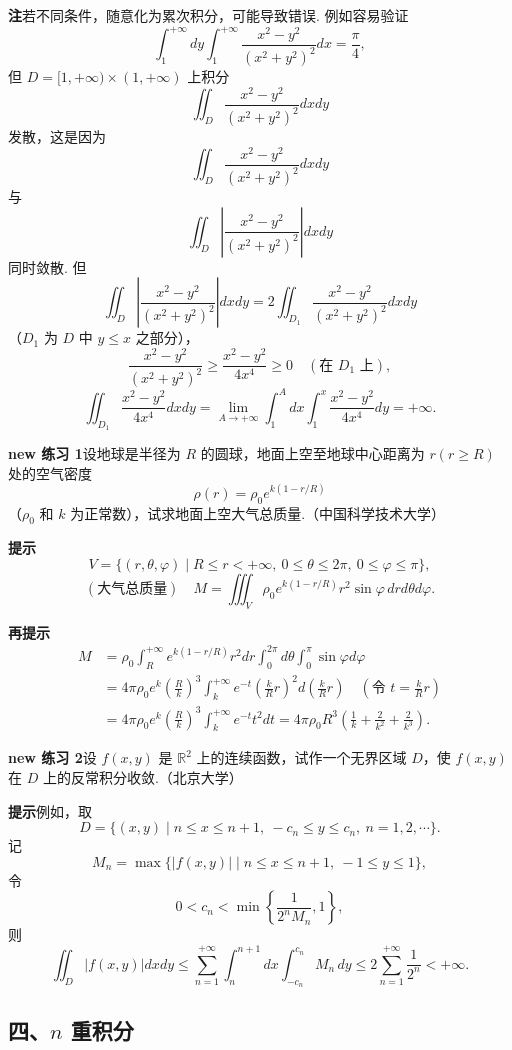\documentclass[UTF8, 12pt, fontset=fandol, oneside]{ctexart}
\begin{document}
\noindent\textbf{注}\quad 若不同条件，随意化为累次积分，可能导致错误. 例如容易验证
\[
\int_1^{+\infty}dy\int_1^{+\infty}\frac{x^2-y^2}{(x^2+y^2)^2}dx=\frac\pi4,
\]
但 $D=[1,+\infty)\times(1,+\infty)$ 上积分
\[
\iint_D\frac{x^2-y^2}{(x^2+y^2)^2}dxdy
\]
发散，这是因为
\[
\iint_D\frac{x^2-y^2}{(x^2+y^2)^2}dxdy
\]
与
\[
\iint_D\left|\frac{x^2-y^2}{(x^2+y^2)^2}\right|dxdy
\]
同时敛散. 但
\[
\iint_D\left|\frac{x^2-y^2}{(x^2+y^2)^2}\right|dxdy
=2\iint_{D_1}\frac{x^2-y^2}{(x^2+y^2)^2}dxdy
\]
（$D_1$ 为 $D$ 中 $y\le x$ 之部分），
\[
\frac{x^2-y^2}{(x^2+y^2)^2}\ge\frac{x^2-y^2}{4x^4}\ge0\quad(\text{在 }D_1\text{ 上}),
\]
\[
\iint_{D_1}\frac{x^2-y^2}{4x^4}dxdy
=\lim_{A\to+\infty}\int_1^A dx\int_1^x
\frac{x^2-y^2}{4x^4}dy=+\infty.
\]

\noindent\textbf{new 练习 1}\quad 设地球是半径为 $R$ 的圆球，地面上空至地球中心距离为 $r(r\ge R)$ 处的空气密度
\[
\rho(r)=\rho_0e^{k(1-r/R)}
\]
（$\rho_0$ 和 $k$ 为正常数），试求地面上空大气总质量.（中国科学技术大学）

\noindent\textbf{提示}\quad
\[
V=\{(r,\theta,\varphi)\mid R\le r<+\infty,\ 0\le\theta\le2\pi,\ 0\le\varphi\le\pi\},
\]
\[
(\text{大气总质量})\quad
M=\iiint_V\rho_0e^{k(1-r/R)}r^2\sin\varphi\,drd\theta d\varphi.
\]

\noindent\textbf{再提示}\quad
\[
\begin{aligned}
M&=\rho_0\int_R^{+\infty}e^{k(1-r/R)}r^2dr\int_0^{2\pi}d\theta\int_0^\pi\sin\varphi d\varphi\\
&=4\pi\rho_0e^k\left(\frac Rk\right)^3
\int_k^{+\infty}e^{-t}\left(\frac{k}{R}r\right)^2d\left(\frac{k}{R}r\right)\quad
\left(\text{令 }t=\frac{k}{R}r\right)\\
&=4\pi\rho_0e^k\left(\frac Rk\right)^3
\int_k^{+\infty}e^{-t}t^2dt
=4\pi\rho_0R^3\left(\frac1k+\frac2{k^2}+\frac2{k^3}\right).
\end{aligned}
\]

\noindent\textbf{new 练习 2}\quad 设 $f(x,y)$ 是 $\mathbb R^2$ 上的连续函数，试作一个无界区域 $D$，使 $f(x,y)$ 在 $D$ 上的反常积分收敛.（北京大学）

\noindent\textbf{提示}\quad 例如，取
\[
D=\{(x,y)\mid n\le x\le n+1,\ -c_n\le y\le c_n,\ n=1,2,\cdots\}.
\]
记
\[
M_n=\max\{|f(x,y)|\mid n\le x\le n+1,\ -1\le y\le1\},
\]
令
\[
0<c_n<\min\left\{\frac1{2^nM_n},1\right\},
\]
则
\[
\iint_D|f(x,y)|dxdy
\le\sum_{n=1}^{+\infty}\int_n^{n+1}dx\int_{-c_n}^{c_n}M_n\,dy
\le2\sum_{n=1}^{+\infty}\frac1{2^n}<+\infty.
\]

\subsection*{四、$n$ 重积分}
\end{document}
